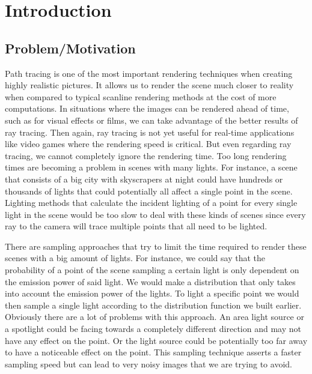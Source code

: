 
\chapter{Introduction}
\label{ch:Introduction}

\section{Problem/Motivation}
\label{sec:Introduction:Motivation}

Path tracing is one of the most important rendering techniques when creating highly realistic pictures. It allows us to render the scene much closer to reality when compared to typical scanline rendering methods at the cost of more computations. In situations where the images can be rendered ahead of time, such as for visual effects or films, we can take advantage of the better results of ray tracing. Then again, ray tracing is not yet useful for real-time applications like video games where the rendering speed is critical. But even regarding ray tracing, we cannot completely ignore the rendering time. Too long rendering times are becoming a problem in scenes with many lights. For instance, a scene that consists of a big city with skyscrapers at night could have hundreds or thousands of lights that could potentially all affect a single point in the scene. Lighting methods that calculate the incident lighting of a point for every single light in the scene would be too slow to deal with these kinds of scenes since every ray to the camera will trace multiple points that all need to be lighted.

There are sampling approaches that try to limit the time required to render these scenes with a big amount of lights. For instance, we could say that the probability of a point of the scene sampling a certain light is only dependent on the emission power of said light. We would make a distribution that only takes into account the emission power of the lights. To light a specific point we would then sample a single light according to the distribution function we built earlier. Obviously there are a lot of problems with this approach. An area light source or a spotlight could be facing towards a completely different direction and may not have any effect on the point. Or the light source could be potentially too far away to have a noticeable effect on the point. This sampling technique asserts a faster sampling speed but can lead to very noisy images that we are trying to avoid.

